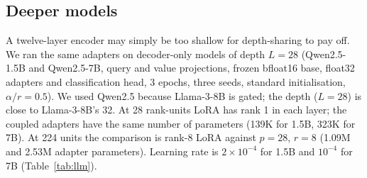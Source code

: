 \documentclass{article}
\theoremstyle{plain}
\begin{document}
\subsection{Deeper models}
\label{sec:deeper}

A twelve-layer encoder may simply be too shallow for depth-sharing to pay off.
We ran the same adapters on decoder-only models of depth $L=28$ (Qwen2.5-1.5B and Qwen2.5-7B, query and value projections, frozen bfloat16 base, float32 adapters and classification head, 3 epochs, three seeds, standard initialisation, $\alpha/r=0.5$).
We used Qwen2.5 because Llama-3-8B is gated; the depth ($L=28$) is close to Llama-3-8B's 32.
At 28 rank-units LoRA has rank 1 in each layer; the coupled adapters have the same number of parameters (139K for 1.5B, 323K for 7B).
At 224 units the comparison is rank-8 LoRA against $p=28$, $r=8$ (1.09M and 2.53M adapter parameters).
Learning rate is $2\times10^{-4}$ for 1.5B and $10^{-4}$ for 7B (Table~\ref{tab:llm}).
\end{document}

